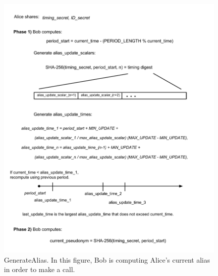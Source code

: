\documentclass[11pt]{article}
\begin{document}
\begin{figure}[p]
	\caption{GenerateAlias. In this figure, Bob is computing Alice's current alias in order to make a call.}
	\centering
	\includegraphics[scale=0.7]{GenerateAlias.pdf}
\end{figure}
\end{document}
